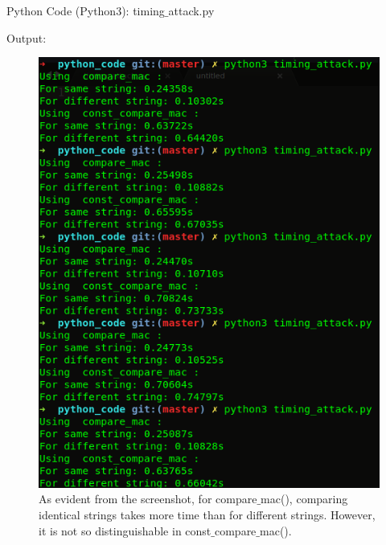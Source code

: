 \documentclass[12pt]{article}
\begin{document}
\begin{large}
Python Code (Python3): timing$\_$attack.py

Output:

\begin{figure}[H]
\centering
\includegraphics[width = 0.62\linewidth]{./images/img1.png}

\caption{As evident from the screenshot, for compare$\_$mac(), comparing identical strings takes more time than for different strings. However, it is not so distinguishable in const$\_$compare$\_$mac().}

\end{figure}

\end{large}
\end{document}
